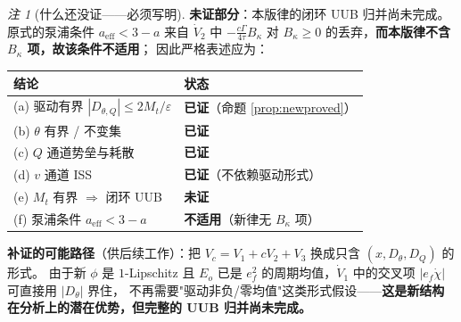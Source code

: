 \documentclass[11pt]{article}
\theoremstyle{remark}\newtheorem{remark}{注}
\newcommand{\ef}{e_f}
\newcommand{\aeff}{a_{\mathrm{eff}}}
\begin{document}
\begin{remark}[什么还没证——必须写明]\label{rem:notproved}
\textbf{未证部分}：本版律的闭环 UUB 归并尚未完成。原式的泵浦条件 $\aeff<3-a$ 来自 $\dot V_2$ 中 $-\frac{c\Gamma}{4\tau}B_\kappa$ 对 $B_\kappa\ge0$ 的丢弃，\textbf{而本版律不含 $B_\kappa$ 项，故该条件不适用}；
因此严格表述应为：
\begin{center}
\small
\begin{tabular}{@{}ll@{}}
\toprule
结论 & 状态 \\
\midrule
(a) 驱动有界 $|D_{\theta,Q}|\le2M_t/\varepsilon$ & \textbf{已证}（命题 \ref{prop:newproved}）\\
(b) $\theta$ 有界 / 不变集 & \textbf{已证} \\
(c) $Q$ 通道势垒与耗散 & \textbf{已证} \\
(d) $v$ 通道 ISS & \textbf{已证}（不依赖驱动形式）\\
(e) $M_t$ 有界 $\Rightarrow$ 闭环 UUB & \textbf{未证} \\
(f) 泵浦条件 $\aeff<3-a$ & \textbf{不适用}（新律无 $B_\kappa$ 项）\\
\bottomrule
\end{tabular}
\end{center}
\textbf{补证的可能路径}（供后续工作）：把 $V_c=V_1+cV_2+V_3$ 换成只含 $(x,D_\theta,D_Q)$ 的形式。
由于新 $\phi$ 是 $1$-Lipschitz 且 $E_o$ 已是 $\ef^{2}$ 的周期均值，$\dot V_1$ 中的交叉项 $|e_f\dot\chi|$ 可直接用 $|D_\theta|$ 界住，
不再需要"驱动非负/零均值"这类形式假设——\textbf{这是新结构在分析上的潜在优势，但完整的 UUB 归并尚未完成。}
\end{remark}
\end{document}
